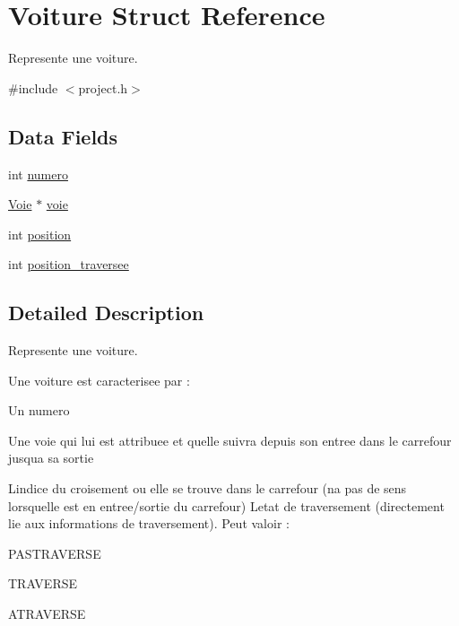 \hypertarget{struct_voiture}{}\section{Voiture Struct Reference}
\label{struct_voiture}


Represente une voiture.  




{\ttfamily \#include $<$project.\+h$>$}

\subsection*{Data Fields}
\begin{DoxyCompactItemize}
\item 
int \hyperlink{struct_voiture_a2c30f43104974e72e2809fb4569804b0}{numero}
\item 
\hyperlink{struct_voie}{Voie} $\ast$ \hyperlink{struct_voiture_acce856164d15fb4096637b544821166d}{voie}
\item 
int \hyperlink{struct_voiture_a401e942526aac47cef94f478182486e7}{position}
\item 
int \hyperlink{struct_voiture_a27b8d3667f2e477b9e64e14cf46056f9}{position\+\_\+traversee}
\end{DoxyCompactItemize}


\subsection{Detailed Description}
Represente une voiture. 

Une voiture est caracterisee par \+:
\begin{DoxyItemize}
\item Un numero
\item Une voie qui lui est attribuee et qu\textquotesingle{}elle suivra depuis son entree dans le carrefour jusqu\textquotesingle{}a sa sortie
\item L\textquotesingle{}indice du croisement ou elle se trouve dans le carrefour (n\textquotesingle{}a pas de sens lorsqu\textquotesingle{}elle est en entree/sortie du carrefour) L\textquotesingle{}etat de traversement (directement lie aux informations de traversement). Peut valoir \+:
\begin{DoxyItemize}
\item P\+A\+S\+T\+R\+A\+V\+E\+R\+S\+E
\item T\+R\+A\+V\+E\+R\+S\+E
\item A\+T\+R\+A\+V\+E\+R\+S\+E 
\end{DoxyItemize}
\end{DoxyItemize}

